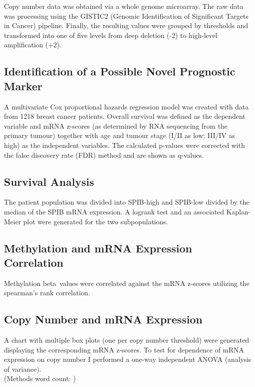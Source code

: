 Copy number data was obtained via a whole genome microarray.
The raw data was processing using the GISTIC2 (Genomic Identification of Significant Targets in Cancer) pipeline.
Finally, the resulting values were grouped by thresholds and transformed into one of five levels from deep deletion (-2) to high-level amplification (+2).

\subsection{Identification of a Possible Novel Prognostic Marker}

A multivariate Cox proportional hazards regression model was created with data from 1218 breast cancer patients.
Overall survival was defined as the dependent variable and mRNA z-scores (as determined by RNA sequencing from the primary tumour) together with age and tumour stage (I/II as low; III/IV as high) as the independent variables.
The calculated p-values were corrected with the false discovery rate (FDR) method and are shown as q-values.

\subsection{Survival Analysis}

The patient population was divided into SPIB-high and SPIB-low divided by the median of the SPIB mRNA expression.
A logrank test and an associated Kaplan-Meier plot were generated for the two subpopulations.

\subsection{Methylation and mRNA Expression Correlation}

Methylation beta\ values were correlated against the mRNA z-scores utilizing the spearman's rank correlation.

\subsection{Copy Number and mRNA Expression}

A chart with multiple box plots (one per copy number threshold) were generated displaying the corresponding mRNA z-scores.
To test for dependence of mRNA expression on copy number I performed a one-way independent ANOVA (analysis of variance).
\\
\endcountem
(Methods word count: \thewordcount{})
